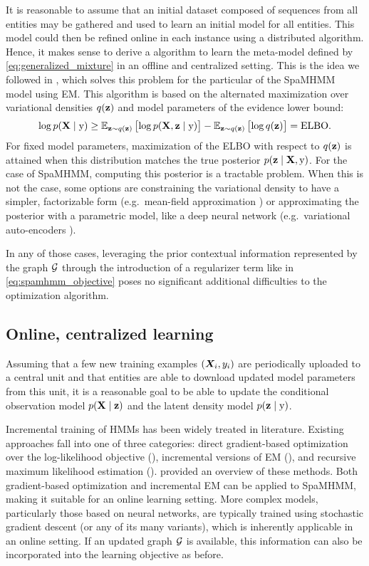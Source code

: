 It is reasonable to assume that an initial dataset composed of sequences from all entities may be gathered and used to learn an initial model for all entities. This model could then be refined online in each instance using a distributed algorithm. Hence, it makes sense to derive a algorithm to learn the meta-model defined by \eqref{eq:generalized_mixture} in an offline and centralized setting. This is the idea we followed in , which solves this problem for the particular of the SpaMHMM model using EM. This algorithm is based on the alternated maximization over variational densities $q({\mathbf{z}})$ and model parameters of the evidence lower bound:
\begin{equation}
    \log p({\mathbf{X}} \mid {\textnormal{y}}) \geq \mathbb{E}_{{\mathbf{z}} \sim q({\mathbf{z}})} \left[\log p({\mathbf{X}}, {\mathbf{z}} \mid {\textnormal{y}}) \right]  - \mathbb{E}_{{\mathbf{z}} \sim q({\mathbf{z}})} \left[\log q({\mathbf{z}})\right] = \mathrm{ELBO}.
\end{equation}
For fixed model parameters, maximization of the ELBO with respect to $q({\mathbf{z}})$ is attained when this distribution matches the true posterior $p({\mathbf{z}} \mid {\mathbf{X}},{\textnormal{y}})$. For the case of SpaMHMM, computing this posterior is a tractable problem. When this is not the case, some options are constraining the variational density to have a simpler, factorizable form (e.g.\ mean-field approximation \cite{Blei2003}) or approximating the posterior with a parametric model, like a deep neural network (e.g.\ variational auto-encoders \cite{Kingma2013}).

In any of those cases, leveraging the prior contextual information represented by the graph ${\mathcal{G}}$ through the introduction of a regularizer term like in \eqref{eq:spamhmm_objective} poses no significant additional difficulties to the optimization algorithm.

\subsection{Online, centralized learning}
\label{sec:online_learning}

Assuming that a few new training examples $({\bm{X}}_i,y_i)$ are periodically uploaded to a central unit and that entities are able to download updated model parameters from this unit, it is a reasonable goal to be able to update the conditional observation model $p({\mathbf{X}} \mid {\mathbf{z}})$ and the latent density model $p({\mathbf{z}} \mid {\textnormal{y}})$.

Incremental training of HMMs has been widely treated in literature. Existing approaches fall into one of three categories: direct gradient-based optimization over the log-likelihood objective (\citet{Baldi1994}), incremental versions of EM (\citet{Digalakis1999, Mongillo2008}), and recursive maximum likelihood estimation (\citet{Ryden1997}). \citet{Khreich2012} provided an overview of these methods. Both gradient-based optimization and incremental EM can be applied to SpaMHMM, making it suitable for an online learning setting. More complex models, particularly those based on neural networks, are typically trained using stochastic gradient descent (or any of its many variants), which is inherently applicable in an online setting. If an updated graph ${\mathcal{G}}$ is available, this information can also be incorporated into the learning objective as before.

